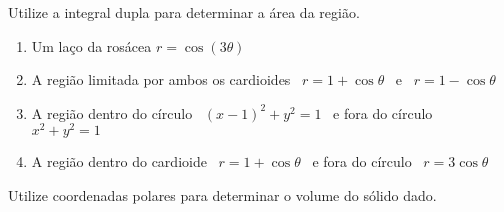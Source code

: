 \documentclass[a4paper, 12pt]{article}
\begin{document}
	\vspace{5mm}
	
	Utilize a integral dupla para determinar a área da região.
	
	\begin{enumerate}[resume]
	
		\item Um laço da rosácea $r = \cos(3\theta)$
		
		\item A região limitada por ambos os cardioides \, $r = 1 + \cos\theta$ \, e \, $r = 1 - \cos\theta$
		
		\item A região dentro do círculo \, $(x-1)^2 + y^2 = 1$ \, e fora do círculo \, $x^2 + y^2 = 1$
		
		\item A região dentro do cardioide \, $r = 1 + \cos\theta$ \, e fora do círculo \, $r = 3\cos\theta$
	
	\end{enumerate}
	
	\vspace{5mm}
	
	Utilize coordenadas polares para determinar o volume do sólido dado.
	
\end{document}
